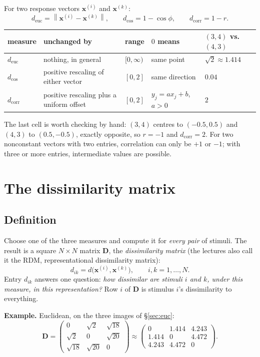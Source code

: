 \documentclass[11pt]{article}
\newcommand{\vx}{\bm{x}}
\newcommand{\mD}{\bm{D}}
\newcommand{\norm}[1]{\left\lVert #1 \right\rVert}
\newcommand{\deuc}{d_{\mathrm{euc}}}
\newcommand{\dcos}{d_{\cos}}
\newcommand{\dcorr}{d_{\mathrm{corr}}}
\begin{document}
For two response vectors $\vx^{(i)}$ and $\vx^{(k)}$:
\[
\deuc = \norm{\vx^{(i)} - \vx^{(k)}}, \qquad
\dcos = 1 - \cos\phi, \qquad
\dcorr = 1 - r .
\]
\begin{center}
\small
\begin{tabular}{@{}lp{3.6cm}lp{2.8cm}l@{}}
\toprule
measure & unchanged by & range & $0$ means & $(3,4)$ vs.\ $(4,3)$ \\
\midrule
$\deuc$ & nothing, in general & $[0, \infty)$ & same point & $\sqrt{2} \approx 1.414$ \\
$\dcos$ & positive rescaling of either vector & $[0, 2]$ & same direction & $0.04$ \\
$\dcorr$ & positive rescaling plus a uniform offset & $[0, 2]$ & $y_j = a x_j + b$, $a > 0$ & $2$ \\
\bottomrule
\end{tabular}
\end{center}
The last cell is worth checking by hand: $(3, 4)$ centres to $(-0.5, 0.5)$ and $(4, 3)$ to
$(0.5, -0.5)$, exactly opposite, so $r = -1$ and $\dcorr = 2$. For two nonconstant vectors
with two entries, correlation can only be $+1$ or $-1$; with three or more entries,
intermediate values are possible.

\section{The dissimilarity matrix}
\label{sec:rdm}

\subsection{Definition}

Choose one of the three measures and compute it for \emph{every pair} of stimuli. The
result is a square $N \times N$ matrix $\mD$, the \emph{dissimilarity matrix} (the
lectures also call it the RDM, representational dissimilarity matrix):
\[
d_{ik} = d\big(\vx^{(i)}, \vx^{(k)}\big), \qquad i, k = 1, \dots, N .
\]
Entry $d_{ik}$ answers one question: \emph{how dissimilar are stimuli $i$ and $k$, under
this measure, in this representation?} Row $i$ of $\mD$ is stimulus $i$'s dissimilarity to
everything.

\textbf{Example.} Euclidean, on the three images of \S\ref{sec:euc}:
\[
\mD =
\begin{pmatrix}
0 & \sqrt{2} & \sqrt{18} \\
\sqrt{2} & 0 & \sqrt{20} \\
\sqrt{18} & \sqrt{20} & 0
\end{pmatrix}
\approx
\begin{pmatrix}
0 & 1.414 & 4.243 \\
1.414 & 0 & 4.472 \\
4.243 & 4.472 & 0
\end{pmatrix} .
\]
\end{document}
